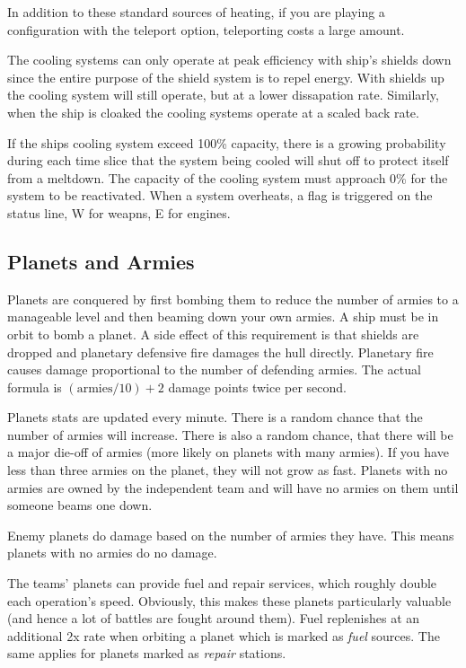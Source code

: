 In addition to these standard sources of heating, if you are playing a
configuration with the teleport option, teleporting costs a large
amount.

The cooling systems can only operate at peak efficiency with ship's
shields down since the entire purpose of the shield system is to repel
energy. With shields up the cooling system will still operate, but at a
lower dissapation rate. Similarly, when the ship is cloaked the cooling
systems operate at a scaled back rate.

If the ships cooling system exceed 100\% capacity, there is a growing
probability during each time slice that the system being cooled will
shut off to protect itself from a meltdown. The capacity of the
cooling system must approach 0\% for the system to be reactivated. When
a system overheats, a flag is triggered on the status line, W for weapns,
E for engines.

\subsection{Planets and Armies}

Planets are conquered by first bombing them to reduce the number of
armies to a manageable level and then beaming down your own armies.  A
ship must be in orbit to bomb a planet.  A side effect of this
requirement is that shields are dropped and planetary defensive fire
damages the hull directly.  Planetary fire causes damage proportional
to the number of defending armies.  The actual formula is
$(\mbox{armies}/ 10) + 2$ damage points twice per second.

Planets stats are updated every minute.  There is a random chance that the
number of armies will increase.  There is also a random chance, that
there will be a major die-off of armies (more likely on planets with many armies).
If you have less than three armies
on the planet, they will not grow as fast.  Planets with no armies are
owned by the independent team and will have no armies on them until
someone beams one down.

Enemy planets do damage based on the number of armies they have.
This means planets with no armies do no damage.  

The teams' planets can provide
fuel and repair services, which roughly double each operation's speed.  
Obviously, this makes these planets
particularly valuable (and hence a lot of battles are fought around them).
Fuel replenishes at an additional 2x rate when orbiting a planet which is 
marked as {\em fuel} sources. The same applies for planets marked as {\em repair}
stations.

